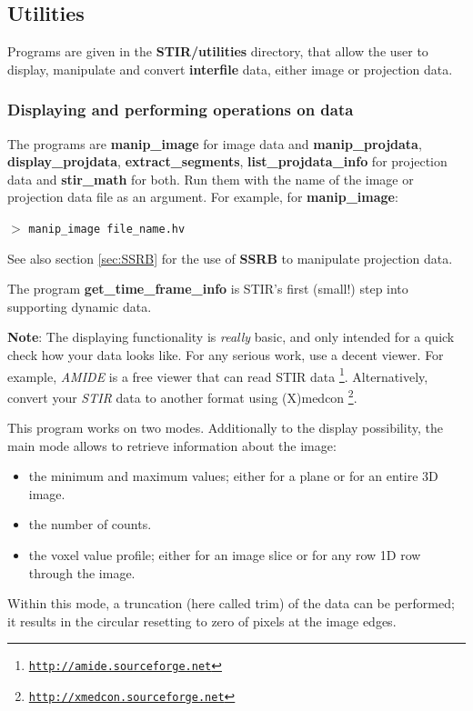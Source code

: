 \documentclass{article}
\def\R2Lurl#1#2{\mbox{\href{#1}{\tt #2}}}
\newcommand{\cmdline}[1]{\par \noindent $>$ \texttt{#1}\par}
\begin{document}
\subsection{
Utilities}

Programs are given in the \textbf{STIR/utilities} directory, that 
allow the user to display, manipulate and convert \textbf{interfile} 
data, either image or projection data.

\subsubsection{
Displaying and performing operations on data}

The programs are \textbf{manip\_image} for image data and \textbf{manip\_projdata}, 
 \textbf{display\_projdata}, \textbf{extract\_segments}, 
\textbf{list\_projdata\_info} for 
projection data and \textbf{stir\_math} for both. Run them with the 
name of the image or projection data file as an argument. For 
example, for \textbf{manip\_image}:
\cmdline{manip\_image file\_name.hv}


See also section \ref{sec:SSRB} for the use of \textbf{SSRB} to manipulate projection 
data.


The program \textbf{get\_time\_frame\_info} is STIR's first (small!) 
step into supporting dynamic data.


\textbf{Note}: The displaying functionality is \textit{really} basic, and 
only intended for a quick check how your data looks like. For 
any serious work, use a decent viewer. For example, \textit{AMIDE} 
is a free viewer that can read STIR data
\footnote{\R2Lurl{http://amide.sourceforge.net }{http://amide.sourceforge.net}}. Alternatively, 
convert your \textit{STIR} data to another format using (X)medcon
\footnote{\R2Lurl{http://xmedcon.sourceforge.net }{http://xmedcon.sourceforge.net}}.

{ 
}

This program works on two modes. Additionally to the display 
possibility, the main mode allows to retrieve information about 
the image:

\begin{itemize}
\item the minimum and maximum values; either for a plane or for an 
entire 3D image.
\item the number of counts.
\item the voxel value profile; either for an image slice or for any 
row 1D row through the image.
\end{itemize}
Within this mode, a truncation (here called trim) of the data 
can be performed; it results in the circular resetting to zero 
of pixels at the image edges.
\end{document}
